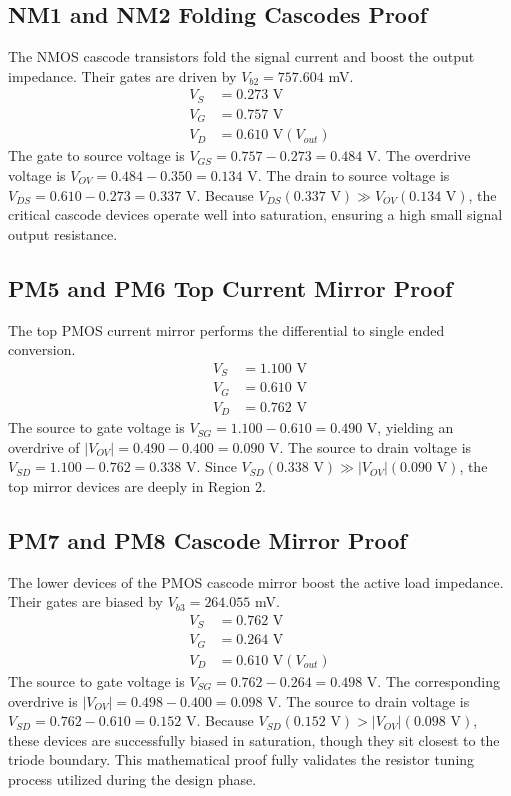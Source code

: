 \documentclass[conference]{IEEEtran}
\begin{document}
\subsection{NM1 and NM2 Folding Cascodes Proof}
The NMOS cascode transistors fold the signal current and boost the output impedance. Their gates are driven by $V_{b2} = 757.604$ mV.
\begin{align}
    V_S &= 0.273\text{ V} \\
    V_G &= 0.757\text{ V} \\
    V_D &= 0.610\text{ V} (V_{out})
\end{align}
The gate to source voltage is $V_{GS} = 0.757 - 0.273 = 0.484$ V. The overdrive voltage is $V_{OV} = 0.484 - 0.350 = 0.134$ V. The drain to source voltage is $V_{DS} = 0.610 - 0.273 = 0.337$ V. Because $V_{DS} (0.337\text{ V}) \gg V_{OV} (0.134\text{ V})$, the critical cascode devices operate well into saturation, ensuring a high small signal output resistance.

\subsection{PM5 and PM6 Top Current Mirror Proof}
The top PMOS current mirror performs the differential to single ended conversion.
\begin{align}
    V_S &= 1.100\text{ V} \\
    V_G &= 0.610\text{ V} \\
    V_D &= 0.762\text{ V}
\end{align}
The source to gate voltage is $V_{SG} = 1.100 - 0.610 = 0.490$ V, yielding an overdrive of $|V_{OV}| = 0.490 - 0.400 = 0.090$ V. The source to drain voltage is $V_{SD} = 1.100 - 0.762 = 0.338$ V. Since $V_{SD} (0.338\text{ V}) \gg |V_{OV}| (0.090\text{ V})$, the top mirror devices are deeply in Region 2.

\subsection{PM7 and PM8 Cascode Mirror Proof}
The lower devices of the PMOS cascode mirror boost the active load impedance. Their gates are biased by $V_{b3} = 264.055$ mV.
\begin{align}
    V_S &= 0.762\text{ V} \\
    V_G &= 0.264\text{ V} \\
    V_D &= 0.610\text{ V} (V_{out})
\end{align}
The source to gate voltage is $V_{SG} = 0.762 - 0.264 = 0.498$ V. The corresponding overdrive is $|V_{OV}| = 0.498 - 0.400 = 0.098$ V. The source to drain voltage is $V_{SD} = 0.762 - 0.610 = 0.152$ V. Because $V_{SD} (0.152\text{ V}) > |V_{OV}| (0.098\text{ V})$, these devices are successfully biased in saturation, though they sit closest to the triode boundary. This mathematical proof fully validates the resistor tuning process utilized during the design phase.
\end{document}
